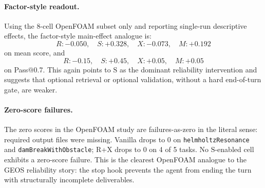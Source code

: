 \documentclass{article}
\begin{document}
\paragraph{Factor-style readout.}
Using the 8-cell OpenFOAM subset only and reporting single-run descriptive effects, the factor-style main-effect analogue is:
\[
R: -0.050,\quad
S: +0.328,\quad
X: -0.073,\quad
M: +0.192
\]
on mean score, and
\[
R: -0.15,\quad
S: +0.45,\quad
X: +0.05,\quad
M: +0.05
\]
on Pass@0.7. This again points to $\mathrm{S}$ as the dominant reliability intervention and suggests that optional retrieval or optional validation, without a hard end-of-turn gate, are weaker.

\begin{table}[t]
  \caption{Per-task OpenFOAM transfer-study scores. The catastrophic failures are concentrated in non-$\mathrm{S}$ cells, especially Vanilla and R+X.}
  \label{tab:openfoam-per-task}
  \centering
  \footnotesize
\end{table}

\paragraph{Zero-score failures.}
The zero scores in the OpenFOAM study are failures-as-zero in the literal sense: required output files were missing. Vanilla drops to 0 on \texttt{helmholtzResonance} and \texttt{damBreakWithObstacle}; R+X drops to 0 on 4 of 5 tasks. No $\mathrm{S}$-enabled cell exhibits a zero-score failure. This is the clearest OpenFOAM analogue to the GEOS reliability story: the stop hook prevents the agent from ending the turn with structurally incomplete deliverables.
\end{document}
